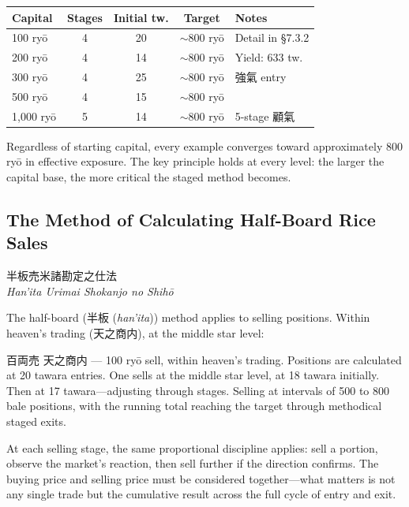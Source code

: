 \documentclass[10pt, openany]{book}
\newcommand{\jp}[1]{{\japanesefont #1}}
\newcommand{\jt}[2]{\jp{#1} (\textit{#2})}
\begin{document}
\begin{center}
\begin{small}
\begin{tabular}{@{}lcccl@{}}
\toprule
\textbf{Capital} & \textbf{Stages} & \textbf{Initial tw.} &
  \textbf{Target} & \textbf{Notes} \\
\midrule
100 ry\=o & 4 & 20 &
  {$\sim$}800 ry\=o & Detail in \S 7.3.2 \\
200 ry\=o & 4 & 14 &
  {$\sim$}800 ry\=o & Yield: 633 tw. \\
300 ry\=o & 4 & 25 &
  {$\sim$}800 ry\=o & \jp{強氣} entry \\
500 ry\=o & 4 & 15 &
  {$\sim$}800 ry\=o & \\
1,000 ry\=o & 5 & 14 &
  {$\sim$}800 ry\=o & 5-stage \jp{顧氣} \\
\bottomrule
\end{tabular}
\end{small}
\end{center}

\vspace{0.5em}

Regardless of starting capital, every example converges toward
approximately 800 ry\=o in effective exposure. The key principle holds at
every level: the larger the capital base, the more critical the staged
method becomes.

\subsection{The Method of Calculating Half-Board Rice Sales}

\begin{center}
\jp{半板売米諸勘定之仕法}\\
\textit{Han'ita Urimai Shokanjo no Shih\=o}
\end{center}

\vspace{0.5em}

The half-board (\jt{半板}{han'ita}) method applies to selling positions.
Within heaven's trading (\jp{天之商内}), at the middle star level:

\jp{百両売 天之商内} --- 100 ry\=o sell, within heaven's trading.
Positions are calculated at 20 tawara entries. One sells at the middle
star level, at 18 tawara initially. Then at 17 tawara---adjusting
through stages. Selling at intervals of 500 to 800 bale positions, with
the running total reaching the target through methodical staged exits.

At each selling stage, the same proportional discipline applies: sell a
portion, observe the market's reaction, then sell further if the direction
confirms. The buying price and selling price must be considered
together---what matters is not any single trade but the cumulative result
across the full cycle of entry and exit.
\end{document}
